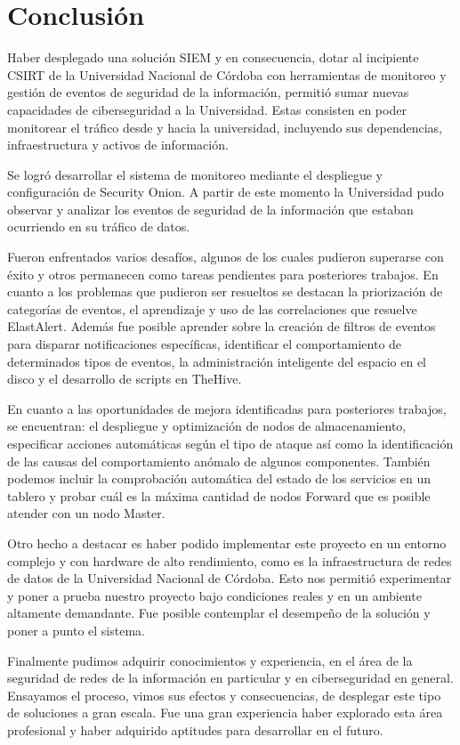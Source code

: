 \chapter{Conclusión}
Haber desplegado una solución SIEM y en consecuencia, dotar al incipiente CSIRT de la Universidad Nacional de Córdoba con herramientas de monitoreo y gestión de eventos de seguridad de la información, permitió sumar nuevas capacidades de ciberseguridad a la Universidad. Estas consisten en poder monitorear el tráfico desde y hacia la universidad, incluyendo sus dependencias, infraestructura y activos de información.
 \par
Se logró desarrollar el sistema de monitoreo mediante el despliegue y configuración de Security Onion. A partir de este momento la Universidad pudo observar y analizar los eventos de seguridad de la información que estaban ocurriendo en su tráfico de datos.  \par
Fueron enfrentados varios desafíos, algunos de los cuales pudieron superarse con éxito y otros permanecen como tareas pendientes para posteriores trabajos. En cuanto a los problemas que pudieron ser resueltos se destacan la priorización de categorías de eventos, el aprendizaje y uso de las correlaciones que resuelve ElastAlert. Además fue posible aprender sobre la creación de filtros de eventos para disparar notificaciones específicas, identificar el comportamiento de determinados tipos de eventos, la administración inteligente del espacio en el disco y el desarrollo de scripts en TheHive. \par
En cuanto a las oportunidades de mejora identificadas para posteriores trabajos, se encuentran: el despliegue y optimización de nodos de almacenamiento, especificar acciones automáticas según el tipo de ataque así como la identificación de las causas del comportamiento anómalo de algunos componentes. También podemos incluir la comprobación automática del estado de los servicios en un tablero y probar cuál es la máxima cantidad de nodos Forward que es posible atender con un nodo Master. \par
Otro hecho a destacar es haber podido implementar este proyecto en un entorno complejo y con hardware de alto rendimiento, como es la infraestructura de redes de datos de la Universidad Nacional de Córdoba. Esto nos permitió experimentar y poner a prueba nuestro proyecto bajo condiciones reales y en un ambiente altamente demandante. Fue posible contemplar el desempeño de la solución y poner a punto el sistema. \par
Finalmente pudimos adquirir conocimientos y experiencia, en el área de la seguridad de redes de la información en particular y en ciberseguridad en general. Ensayamos el proceso, vimos sus efectos y consecuencias, de desplegar este tipo de soluciones a gran escala. Fue una gran experiencia haber explorado esta área profesional y haber adquirido aptitudes para desarrollar en el futuro. \par


